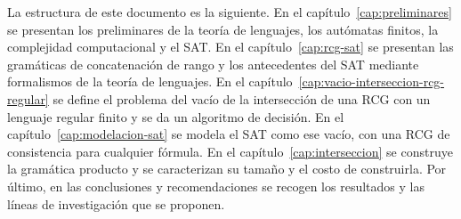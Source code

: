 La estructura de este documento es la siguiente. En el
capítulo~\ref{cap:preliminares} se presentan los preliminares de la
teoría de lenguajes, los autómatas finitos, la complejidad computacional
y el SAT. En el capítulo~\ref{cap:rcg-sat} se presentan las gramáticas de
concatenación de rango y los antecedentes del SAT mediante formalismos de
la teoría de lenguajes. En el capítulo~\ref{cap:vacio-interseccion-rcg-regular}
se define el problema del vacío de la intersección de una RCG con un
lenguaje regular finito y se da un algoritmo de decisión. En el
capítulo~\ref{cap:modelacion-sat} se modela el SAT como ese vacío, con una
RCG de consistencia para cualquier fórmula. En el
capítulo~\ref{cap:interseccion} se construye la gramática producto y se
caracterizan su tamaño y el costo de construirla. Por último, en las
conclusiones y recomendaciones se recogen los resultados y las líneas de
investigación que se proponen.


